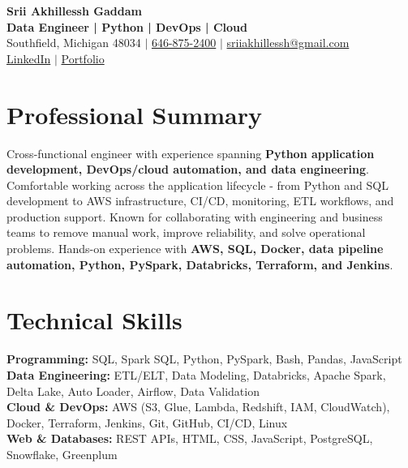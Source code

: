 \documentclass[letterpaper,10pt]{article}
\begin{document}
\fontsize{9.35pt}{10.45pt}\selectfont

\begin{center}
    {\LARGE \textbf{Srii Akhillessh Gaddam}} \\[-1pt]
    \textbf{Data Engineer | Python | DevOps | Cloud} \\[2pt]
    Southfield, Michigan 48034 $|$
    \href{tel:6468752400}{646-875-2400} $|$
    \href{mailto:sriiakhillessh@gmail.com}{sriiakhillessh@gmail.com} \\[1pt]
    \href{https://www.linkedin.com/in/srii-akhiilessh-gaddam-b48668191/}{LinkedIn} $|$
    \href{https://sriiakhillesshg.github.io/portfolio/}{Portfolio}
\end{center}
\vspace{-8pt}

\section{Professional Summary}
\small{Cross-functional engineer with experience spanning \textbf{Python application development, DevOps/cloud automation, and data engineering}. Comfortable working across the application lifecycle - from Python and SQL development to AWS infrastructure, CI/CD, monitoring, ETL workflows, and production support. Known for collaborating with engineering and business teams to remove manual work, improve reliability, and solve operational problems. Hands-on experience with \textbf{AWS, SQL, Docker, data pipeline automation, Python, PySpark, Databricks, Terraform, and Jenkins}.}

\section{Technical Skills}
\small{
\textbf{Programming:} SQL, Spark SQL, Python, PySpark, Bash, Pandas, JavaScript \\
\textbf{Data Engineering:} ETL/ELT, Data Modeling, Databricks, Apache Spark, Delta Lake, Auto Loader, Airflow, Data Validation \\
\textbf{Cloud \& DevOps:} AWS (S3, Glue, Lambda, Redshift, IAM, CloudWatch), Docker, Terraform, Jenkins, Git, GitHub, CI/CD, Linux \\
\textbf{Web \& Databases:} REST APIs, HTML, CSS, JavaScript, PostgreSQL, Snowflake, Greenplum
}

\end{document}
